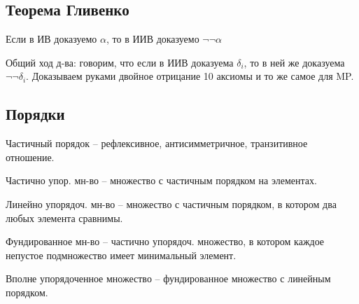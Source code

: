 \subsection{Теорема Гливенко}
\label{sec-2-6}
Если в ИВ доказуемо $\alpha$, то в ИИВ доказуемо $\lnot \lnot \alpha$

Общий ход д-ва: говорим, что если в ИИВ доказуема $\delta_{i}$,
то в ней же доказуема $\lnot \lnot \delta_{i}$. Доказываем руками двойное
отрицание 10 аксиомы и то же самое для MP.
\subsection{Порядки}
\label{sec-2-7}
\begin{definition}
    Частичный порядок – рефлексивное, антисимметричное, транзитивное
отношение.
\end{definition}
\begin{definition}
    Частично упор. мн-во -- множество с частичным порядком на элементах.
\end{definition}
\begin{definition}
    Линейно упорядоч. мн-во -- множество с частичным порядком, в котором
    два любых элемента сравнимы.
\end{definition}
\begin{definition}
    Фундированное мн-во -- частично упорядоч. множество, в котором каждое
    непустое подмножество имеет минимальный элемент.
\end{definition}
\begin{definition}
    Вполне упорядоченное множество -- фундированное множество с линейным
    порядком.
\end{definition}

